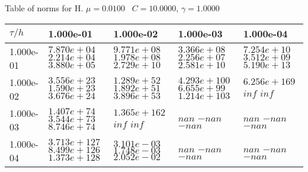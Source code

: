 \begin{center}
Table of norms for H. $\mu = 0.0100$ \, $C = 10.0000$, $\gamma = 1.0000$
  
\begin{tabular}{|p{1in}|p{1in}|p{1in}|p{1in}|p{1in}|} \hline
$\tau / h$ &1.000e-01 &1.000e-02 &1.000e-03 &1.000e-04 \\ \hline 
1.000e-01 & $7.870e+04$  $2.214e+04$  $3.880e+05$  & $9.771e+08$  $1.978e+08$  $2.729e+10$  & $3.366e+08$  $2.256e+07$  $2.581e+10$  & $7.254e+10$  $3.512e+09$  $5.190e+13$  \\ \hline 
1.000e-02 & $3.556e+23$  $1.590e+23$  $3.676e+24$  & $1.289e+52$  $1.892e+51$  $3.896e+53$  & $4.293e+100$  $6.655e+99$  $1.214e+103$  & $6.256e+169$  $inf$  $inf$  \\ \hline 
1.000e-03 & $1.407e+74$  $3.544e+73$  $8.746e+74$  & $1.365e+162$  $inf$  $inf$  & $nan$  $-nan$  $-nan$  & $nan$  $-nan$  $-nan$  \\ \hline 
1.000e-04 & $3.713e+127$  $8.499e+126$  $1.373e+128$  & $3.101e-03$  $1.748e-03$  $2.052e-02$  & $nan$  $-nan$  $-nan$  & $nan$  $-nan$  $-nan$  \\ \hline 

\end{tabular}\\[20pt]
\end{center}
